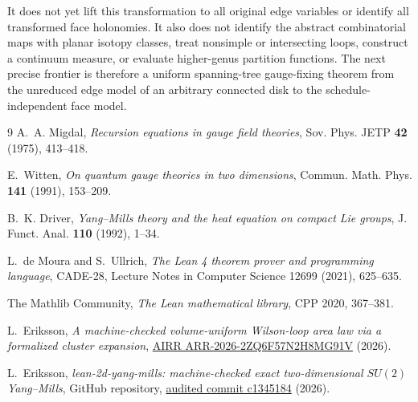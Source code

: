 \documentclass[11pt,a4paper]{article}
\theoremstyle{remark}
\begin{document}
It does not yet lift this transformation to all original edge variables or
identify all transformed face holonomies.  It also does not identify the
abstract combinatorial maps with planar isotopy classes, treat nonsimple or
intersecting loops, construct a continuum measure, or evaluate higher-genus
partition functions.  The next precise frontier is therefore a uniform
spanning-tree gauge-fixing theorem from the unreduced edge model of an
arbitrary connected disk to the schedule-independent face model.

\begin{thebibliography}{9}
A.~A. Migdal, \emph{Recursion equations in gauge field theories},
Sov. Phys. JETP \textbf{42} (1975), 413--418.

E.~Witten, \emph{On quantum gauge theories in two dimensions},
Commun. Math. Phys. \textbf{141} (1991), 153--209.

B.~K. Driver, \emph{Yang--Mills theory and the heat equation on compact Lie
groups}, J. Funct. Anal. \textbf{110} (1992), 1--34.

L.~de Moura and S.~Ullrich, \emph{The Lean 4 theorem prover and programming
language}, CADE-28, Lecture Notes in Computer Science 12699 (2021), 625--635.

The Mathlib Community, \emph{The Lean mathematical library},
CPP 2020, 367--381.

L.~Eriksson, \emph{A machine-checked volume-uniform Wilson-loop area law via a
formalized cluster expansion},
\href{https://airr.science/papers/ARR-2026-2ZQ6F57N2H8MG91V/}{AIRR ARR-2026-2ZQ6F57N2H8MG91V} (2026).

L.~Eriksson, \emph{lean-2d-yang-mills: machine-checked exact two-dimensional
$SU(2)$ Yang--Mills}, GitHub repository,
\href{https://github.com/lluiseriksson/lean-2d-yang-mills/tree/c13451842768e02a3c97afe11c8dcb9523c2c727}{audited commit c1345184}
(2026).
\end{thebibliography}
\end{document}
